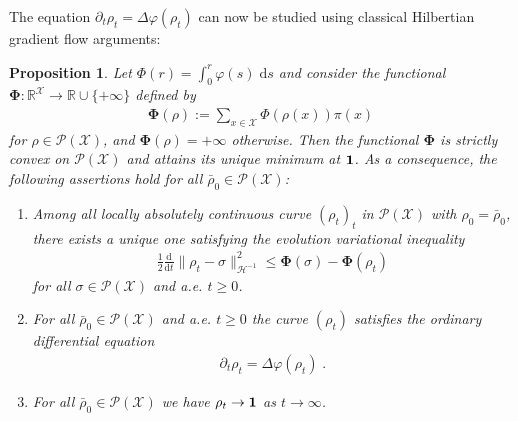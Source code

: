 \documentclass[a4paper,11pt,reqno]{amsart}
\theoremstyle{plain}
\newtheorem{proposition}[theorem]{Proposition}
\theoremstyle{remark}
\numberwithin{equation}{section}
\begin{document}
The equation $\partial_t \rho_t = \Delta {\varphi}(\rho_t)$ can now 
be studied using classical Hilbertian gradient flow arguments:

\begin{proposition}\label{prop:classical}
Let $\Phi(r) = \int_0^r {\varphi}(s) {\; \mathrm{d}} s$ and consider the functional 
${\boldsymbol{\Phi}} : {{\mathbb R}}^{\mathcal{X}} \to {{\mathbb R}} \cup \{+ \infty\}$ defined by
\begin{align*}
 {\boldsymbol{\Phi}}(\rho) := \sum_{x \in {\mathcal{X}}} \Phi(\rho(x)) \pi(x)
\end{align*}
for $\rho \in {{\mathscr{P}}({\mathcal{X}})}$, and ${\boldsymbol{\Phi}}(\rho) = + \infty$ otherwise.  Then the
functional ${\boldsymbol{\Phi}}$ is strictly convex on ${{\mathscr{P}}({\mathcal{X}})}$ and attains its unique
minimum at ${{{\bf 1}}}$.  As a consequence, the following assertions hold
for all $\bar\rho_0 \in {{\mathscr{P}}({\mathcal{X}})}$:
\begin{enumerate}
\item Among all locally absolutely continuous curve $(\rho_t)_t$ in
  ${{\mathscr{P}}({\mathcal{X}})}$ with $\rho_0 = \bar \rho_0$, there exists a unique one
  satisfying the evolution variational inequality 
\begin{align}\label{eq:hilbert-evi}
 \frac12 {\frac{\mathrm{d}}{\mathrm{d}t}}\| \rho_t - \sigma \|_{{\mathscr{H}}^{-1}}^2 
    \leq {\boldsymbol{\Phi}}(\sigma) - {\boldsymbol{\Phi}}(\rho_t)
\end{align}
for all $\sigma \in {{\mathscr{P}}({\mathcal{X}})}$ and a.e. $t \geq 0$.
\item For all $\bar\rho_0 \in
  {{\mathscr{P}}({\mathcal{X}})}$ and a.e. $t\geq 0$ the curve $(\rho_t)$ satisfies the ordinary
  differential equation
\begin{align*}
 \partial_t \rho_t = \Delta {\varphi}(\rho_t)\;.
\end{align*}
\item For all $\bar\rho_0 \in {{\mathscr{P}}({\mathcal{X}})}$ we have $\rho_t \to {{{\bf 1}}}$ as $t \to
  \infty$.
\end{enumerate}
\end{proposition}
\end{document}

